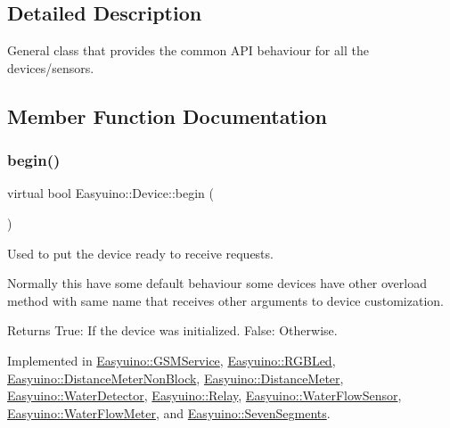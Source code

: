 \subsection{Detailed Description}
General class that provides the common A\+PI behaviour for all the devices/sensors. 

\subsection{Member Function Documentation}
\mbox{\label{class_easyuino_1_1_device_a2e7bb2fec849719a9d9432b57cdb72ba}} 
\subsubsection{\texorpdfstring{begin()}{begin()}}
{\footnotesize\ttfamily virtual bool Easyuino\+::\+Device\+::begin (\begin{DoxyParamCaption}{ }\end{DoxyParamCaption})\hspace{0.3cm}{\ttfamily [pure virtual]}}



Used to put the device ready to receive requests. 

Normally this have some default behaviour some devices have other overload method with same name that receives other arguments to device customization. \begin{DoxyReturn}{Returns}
True\+: If the device was initialized. False\+: Otherwise. 
\end{DoxyReturn}


Implemented in \hyperlink{class_easyuino_1_1_g_s_m_service_aeafc2dae47e4b13e127eb228a0f7ff6a}{Easyuino\+::\+G\+S\+M\+Service}, \hyperlink{class_easyuino_1_1_r_g_b_led_abdc3512266c7f584609147fccc1ec816}{Easyuino\+::\+R\+G\+B\+Led}, \hyperlink{class_easyuino_1_1_distance_meter_non_block_a46d2093d0fc125e98c3602868c088a77}{Easyuino\+::\+Distance\+Meter\+Non\+Block}, \hyperlink{class_easyuino_1_1_distance_meter_a0374e6f806cd71f0f918c6ea7b7700a0}{Easyuino\+::\+Distance\+Meter}, \hyperlink{class_easyuino_1_1_water_detector_af7a0ec32d6abcb8c1060f493525d5228}{Easyuino\+::\+Water\+Detector}, \hyperlink{class_easyuino_1_1_relay_a920a0fa287cacfd8c6df19d8812d4958}{Easyuino\+::\+Relay}, \hyperlink{class_easyuino_1_1_water_flow_sensor_a55dcab6c527b1e1951a1fff69efdb763}{Easyuino\+::\+Water\+Flow\+Sensor}, \hyperlink{class_easyuino_1_1_water_flow_meter_a400c25b10a7cde45c623805546d071cd}{Easyuino\+::\+Water\+Flow\+Meter}, and \hyperlink{class_easyuino_1_1_seven_segments_ab59d5cbdc22567fb97854f32d899e02d}{Easyuino\+::\+Seven\+Segments}.

